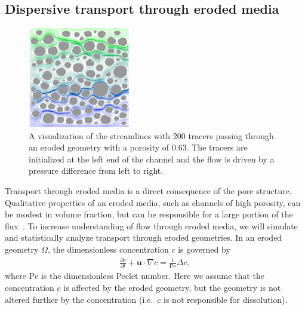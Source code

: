 \documentclass[11pt]{article}
\newcommand{\pd}[2]{ \frac{ \partial #1}{ \partial #2 } }
\newcommand{\bvec}[1]{{\mathbf{#1}}}
\newcommand{\Pe}{\mathrm{Pe}}
\newcommand{\uu}{\bvec{u}}
\begin{document}
\subsection{Dispersive transport through eroded media}

\begin{figure}
  \includegraphics[width=0.4\textwidth]{figs/100b_t100tracer}
  \caption{\label{fig:100tracers} A visualization of the streamlines
  with 200 tracers passing through an eroded geometry with a porosity of
  0.63. The tracers are initialized at the left end of the channel and
  the flow is driven by a pressure difference from left to right.}
\end{figure}

Transport through eroded media is a direct consequence of the pore structure. Qualitative properties of an eroded media, such as channels of high porosity, can be modest in volume fraction, but can be responsible for a large portion of the flux~\cite{Quaife2018}.  To increase understanding of flow through eroded media, we will simulate and statistically analyze transport through eroded geometries. In an eroded geometry $\Omega$, the dimensionless concentration $c$ is governed by
\begin{align}
  \pd{c}{t} + \uu \cdot \nabla c = \frac{1}{\Pe} \Delta c, 
  \label{eqn:advectionDiffusion}
\end{align}
where $\Pe$ is the dimensionless Peclet number. Here we assume that the concentration $c$ is affected by the eroded geometry, but the geometry is not altered further by the concentration (i.e.~$c$ is not responsible for dissolution).  
\end{document}
